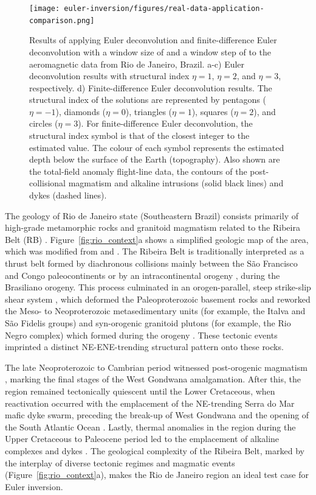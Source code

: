 \begin{figure}[tb!]
\centering
\texttt{[image: euler-inversion/figures/real-data-application-comparison.png]}
\caption{
    Results of applying Euler deconvolution and finite-difference Euler
    deconvolution with a window size of \RioWindowSize{} and a window step of
    \RioWindowStep{} to the aeromagnetic data from Rio de Janeiro, Brazil.
    a-c) Euler deconvolution results with structural index $\eta=1$, $\eta=2$,
    and $\eta=3$, respectively.
    d) Finite-difference Euler deconvolution results.
    The structural index of the solutions are represented by pentagons
    ($\eta=-1$),  diamonds ($\eta=0$),  triangles ($\eta=1$),  squares
    ($\eta=2$), and circles ($\eta=3$).
    For finite-difference Euler deconvolution, the structural index symbol is
    that of the closest integer to the estimated value.
    The colour of each symbol represents the estimated depth below the surface
    of the Earth (topography).
    Also shown are the total-field anomaly flight-line data, the contours of
    the post-collisional magmatism and alkaline intrusions (solid black lines)
    and dykes (dashed lines).
}
\label{fig:rio_comp}
\end{figure}

The geology of Rio de Janeiro state (Southeastern Brazil) consists primarily of
high-grade metamorphic rocks and granitoid magmatism related to the Ribeira
Belt (RB) \citep{Heilbron2020}.
Figure~\ref{fig:rio_context}a shows a simplified geologic map of the area,
which was modified from \citet{Heilbron2016} and \citet{Dantas2017}.
The Ribeira Belt is traditionally interpreted as a thrust
belt formed by diachronous collisions mainly between the São Francisco and
Congo paleocontinents \citep{Heilbron2008, Trouw2000} or by an intracontinental
orogeny \citep[\textit{e.g.}][]{Meira2015, Meira2019}, during the Brasiliano
orogeny. This process culminated in an orogen-parallel, steep strike-slip shear
system \citep{EgydioSilva2005}, which deformed the Paleoproterozoic basement
rocks and reworked the Meso- to Neoproterozoic metasedimentary units (for
example, the Italva and São Fidelis groups) and syn-orogenic granitoid plutons
(for example, the Rio Negro complex) which formed during the orogeny
\citep{Heilbron2003, Heilbron2020}.
These tectonic events imprinted a distinct NE-ENE-trending structural pattern
onto these rocks.

The late Neoproterozoic to Cambrian period witnessed post-orogenic magmatism
\citep[\textit{e.g.,}][]{Valeriano2011}, marking the final stages of the West
Gondwana amalgamation. After this, the region remained tectonically quiescent
until the Lower Cretaceous, when reactivation occurred with the emplacement of
the NE-trending Serra do Mar mafic dyke swarm, preceding the break-up of West
Gondwana and the opening of the South Atlantic Ocean \citep{Almeida2013}.
Lastly, thermal anomalies in the region during the Upper Cretaceous to
Paleocene period led to the emplacement of alkaline complexes and dykes
\citep{Thompson1998}.
The geological complexity of the Ribeira Belt, marked by the interplay of
diverse tectonic regimes and magmatic events (Figure~\ref{fig:rio_context}a),
makes the Rio de Janeiro region an ideal test case for Euler inversion.

